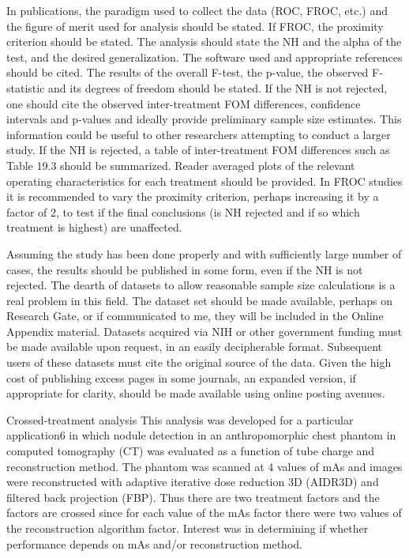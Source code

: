\documentclass[
]{book}
\begin{document}
In publications, the paradigm used to collect the data (ROC, FROC, etc.) and the figure of merit used for analysis should be stated. If FROC, the proximity criterion should be stated. The analysis should state the NH and the alpha of the test, and the desired generalization. The software used and appropriate references should be cited. The results of the overall F-test, the p-value, the observed F-statistic and its degrees of freedom should be stated. If the NH is not rejected, one should cite the observed inter-treatment FOM differences, confidence intervals and p-values and ideally provide preliminary sample size estimates. This information could be useful to other researchers attempting to conduct a larger study. If the NH is rejected, a table of inter-treatment FOM differences such as Table 19.3 should be summarized. Reader averaged plots of the relevant operating characteristics for each treatment should be provided. In FROC studies it is recommended to vary the proximity criterion, perhaps increasing it by a factor of 2, to test if the final conclusions (is NH rejected and if so which treatment is highest) are unaffected.

Assuming the study has been done properly and with sufficiently large number of cases, the results should be published in some form, even if the NH is not rejected. The dearth of datasets to allow reasonable sample size calculations is a real problem in this field. The dataset set should be made available, perhaps on Research Gate, or if communicated to me, they will be included in the Online Appendix material. Datasets acquired via NIH or other government funding must be made available upon request, in an easily decipherable format. Subsequent users of these datasets must cite the original source of the data. Given the high cost of publishing excess pages in some journals, an expanded version, if appropriate for clarity, should be made available using online posting avenues.

Crossed-treatment analysis
This analysis was developed for a particular application6 in which nodule detection in an anthropomorphic chest phantom in computed tomography (CT) was evaluated as a function of tube charge and reconstruction method. The phantom was scanned at 4 values of mAs and images were reconstructed with adaptive iterative dose reduction 3D (AIDR3D) and filtered back projection (FBP). Thus there are two treatment factors and the factors are crossed since for each value of the mAs factor there were two values of the reconstruction algorithm factor. Interest was in determining if whether performance depends on mAs and/or reconstruction method.
\end{document}
